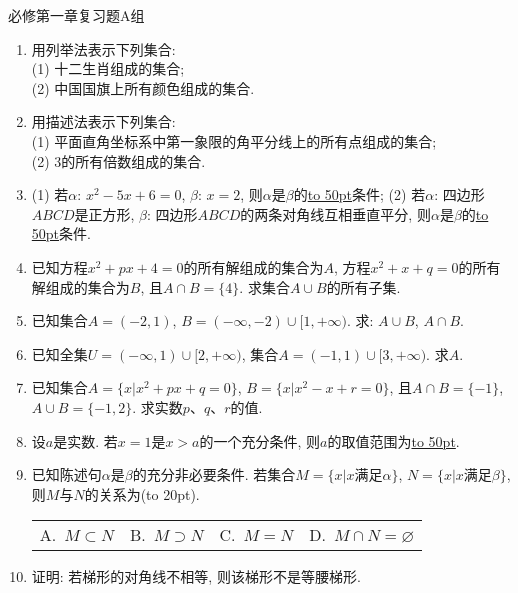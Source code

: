 \documentclass[10pt,a4paper]{article}
\newcommand{\blank}[1]{\underline{\hbox to #1pt{}}}
\newcommand{\bracket}[1]{(\hbox to #1pt{})}
\newcommand{\fourch}[4]{\par\begin{tabular}{p{.23\textwidth}p{.23\textwidth}p{.23\textwidth}p{.23\textwidth}}
A.~#1 &B.~#2& C.~#3& D.~#4
\end{tabular}}
\begin{document}
必修第一章复习题A组
\begin{enumerate}[1.]
\item 用列举法表示下列集合:\\
(1) 十二生肖组成的集合;\\
(2) 中国国旗上所有颜色组成的集合.
\item 用描述法表示下列集合:\\
(1) 平面直角坐标系中第一象限的角平分线上的所有点组成的集合;\\
(2) $3$的所有倍数组成的集合.
\item (1) 若$\alpha$: $x^2-5x+6=0$, $\beta$: $x=2$, 则$\alpha$是$\beta$的\blank{50}条件;
(2) 若$\alpha$: 四边形$ABCD$是正方形, $\beta$: 四边形$ABCD$的两条对角线互相垂直平分, 则$\alpha$是$\beta$的\blank{50}条件.
\item 已知方程$x^2+px+4=0$的所有解组成的集合为$A$, 方程$x^2+x+q=0$的所有解组成的集合为$B$, 且$A\cap B=\{4\}$. 求集合$A\cup B$的所有子集.
\item 已知集合$A=(-2, 1)$, $B=(-\infty, -2)\cup [1, +\infty)$. 求: $A\cup B$, $A\cap B$.
\item 已知全集$U=(-\infty, 1)\cup [2, +\infty)$, 集合$A=(-1, 1)\cup [3, +\infty)$. 求$A$.
\item 已知集合$A=\{x|x^2+px+q=0\}$, $B=\{x|x^2-x+r=0\}$, 且$A\cap B=\{-1\}$, $A\cup B=\{-1, 2\}$. 求实数$p$、$q$、$r$的值.
\item 设$a$是实数. 若$x=1$是$x>a$的一个充分条件, 则$a$的取值范围为\blank{50}.
\item 已知陈述句$\alpha$是$\beta$的充分非必要条件. 若集合$M=\{x|x\text{满足}\alpha\}$, $N=\{x|x\text{满足}\beta\}$, 则$M$与$N$的关系为\bracket{20}.
\fourch{$M\subset N$}{$M\supset N$}{$M=N$}{$M\cap N=\varnothing$}
\item 证明: 若梯形的对角线不相等, 则该梯形不是等腰梯形.
\end{enumerate}
\end{document}
